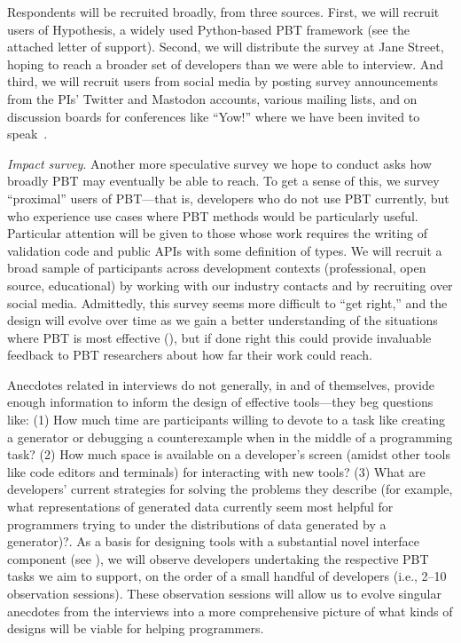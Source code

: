 Respondents will
be recruited broadly, from three sources. First, we will recruit
users of Hypothesis, a widely used Python-based PBT
framework
(see the attached letter of support).
Second, we will distribute the survey at Jane Street, hoping to reach
a broader set of developers than we were able to interview.
And third, we will recruit users from social media by posting
survey announcements from the PIs' Twitter and Mastodon
accounts, various mailing lists, and on discussion boards for conferences like
``Yow!'' where we have been invited to speak~\cite{noauthor_when_nodate}.

\emph{Impact survey}. Another more speculative survey we hope to conduct asks
how broadly PBT may eventually be able to reach.  To get a sense of this, we
survey ``proximal'' users of PBT---that is, developers who do not use PBT
currently, but who experience use cases where PBT methods would be particularly
useful.  Particular attention will be given to those whose work requires the
writing of validation code and public APIs with some definition of types. We
will recruit a broad sample of participants across development contexts
(professional, open source, educational) by working with our industry contacts
and by recruiting over social media. Admittedly, this survey seems more
difficult to ``get right,'' and the design will evolve over time as we gain a
better understanding of the situations where PBT is most effective
(), but if done right this could provide invaluable
feedback to PBT researchers about how far their work could reach.

%
Anecdotes related in interviews do not generally, in and of
themselves, provide enough information to inform the design of
effective tools---they beg questions like: (1) How much time
are participants willing to devote to
a task like creating a generator or debugging a counterexample when in the
middle of a programming task? (2) How much space is available on a developer's
screen (amidst other tools like code editors and terminals) for
interacting with new
tools? (3) What are developers' current strategies for solving the
problems they describe
(for example, what representations of generated data currently seem most helpful
for programmers trying to under the distributions of data generated by a
generator)?.  As a basis for designing tools with a substantial novel interface
component (see ), we will observe developers
undertaking the respective PBT tasks we
aim to support, on the order of a small handful of developers (i.e., 2--10
observation sessions). These observation sessions will allow us to evolve
singular anecdotes from the interviews into a more comprehensive picture of
what kinds of designs will be viable for helping programmers.


